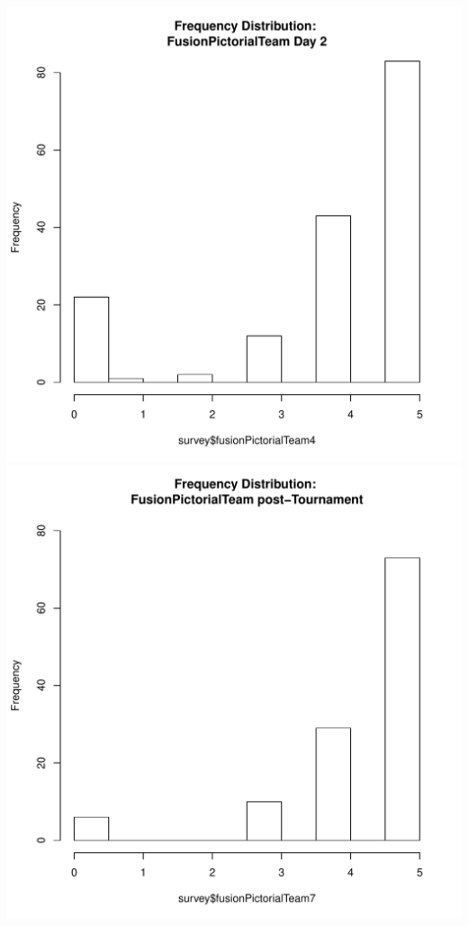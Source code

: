 \documentclass[12pt]{report}
\begin{document}
\includegraphics[scale =.4]{../images/distFusionPictorialTeamDay2.pdf}
\includegraphics[scale =.4]{../images/distFusionPictorialTeamPost.pdf}
\end{document}
